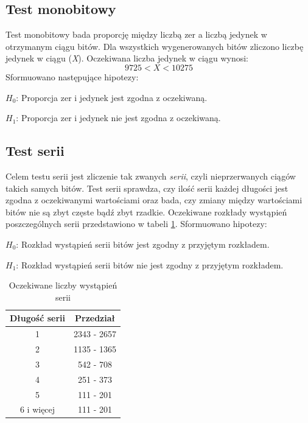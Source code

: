 \subsection{Test monobitowy}
\label{monbitOpis}
Test monobitowy bada proporcję między liczbą zer a liczbą jedynek w otrzymanym ciągu bitów. Dla wszystkich 
wygenerowanych bitów zliczono liczbę jedynek w ciągu (\textit{X}). Oczekiwana liczba jedynek w ciągu wynosi:
\begin{displaymath}
    9725 < X < 10275
\end{displaymath}
Sformuowano następujące hipotezy:
\par \begin{math} H_0 \end{math}: Proporcja zer i jedynek jest zgodna z oczekiwaną.
\par \begin{math} H_1 \end{math}: Proporcja zer i jedynek nie jest zgodna z oczekiwaną.

\subsection{Test serii}
Celem testu serii jest zliczenie tak zwanych \textit{serii}, czyli nieprzerwanych ciągów takich samych bitów. Test serii
sprawdza, czy ilość serii każdej długości jest zgodna z oczekiwanymi wartościami oraz bada, czy zmiany między 
wartościami bitów nie są zbyt częste bądź zbyt rzadkie. Oczekiwane rozkłady wystąpień poszczególnych serii przedstawiono
w tabeli \ref{serieOczekiwane}. Sformuowano hipotezy:
\par \begin{math} H_0 \end{math}: Rozkład wystąpień serii bitów jest zgodny z przyjętym rozkładem.
\par \begin{math} H_1 \end{math}: Rozkład wystąpień serii bitów nie jest zgodny z przyjętym rozkładem.
\begin{table}[h]
    \centering
    \caption{Oczekiwane liczby wystąpień serii}
    \label{serieOczekiwane}
    \begin{tabular}{|c|c|} 
        \hline
        Długość serii & Przedział \\
        \hline
        1 & 2343 - 2657 \\
        \hline
        2 & 1135 - 1365 \\
        \hline
        3 & 542 - 708 \\
        \hline
        4 & 251 - 373 \\
        \hline
        5 & 111 - 201 \\
        \hline
        6 i więcej & 111 - 201 \\
        \hline  
    \end{tabular} 
\end{table}   
